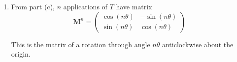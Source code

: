 \documentclass[leqno]{article}
\begin{document}
\begin{enumerate}[
  label=\textbf{\arabic*.},
  leftmargin=*,
  topsep=0pt,
  partopsep=0pt,
  parsep=0pt
]
\begin{djsSolution}
\begin{enumerate}[label=\textbf{(\alph*)}]
  If the statement is true for $n=k$, then it is true for $n=k+1$. Since it is true for $n=1$, by the principle of mathematical induction
  \[
  \mathbf{M}^n=
  \begin{pmatrix}
  \cos(n\theta) & -\sin(n\theta)\\
  \sin(n\theta) & \cos(n\theta)
  \end{pmatrix}
  \]

  for all positive integers $n$.

  \item From part (c), $n$ applications of $T$ have matrix
  \[
  \mathbf{M}^n=
  \begin{pmatrix}
  \cos(n\theta) & -\sin(n\theta)\\
  \sin(n\theta) & \cos(n\theta)
  \end{pmatrix}
  \]

  This is the matrix of a rotation through angle $n\theta$ anticlockwise about the origin.
\end{enumerate}
\end{djsSolution}


\end{enumerate}
\end{document}
